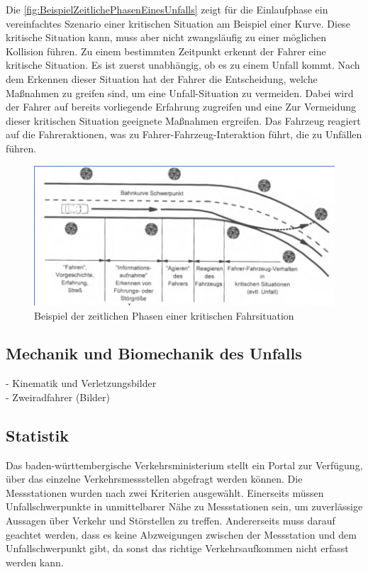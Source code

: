 Die \autoref{fig:BeispielZeitlichePhasenEinesUnfalls} zeigt für die Einlaufphase ein vereinfachtes Szenario einer kritischen Situation am Beispiel einer Kurve. Diese kritische Situation kann, muss aber nicht zwangsläufig zu einer möglichen Kollision führen. Zu einem bestimmten Zeitpunkt erkennt der Fahrer eine kritische Situation. Es ist zuerst unabhängig, ob es zu einem Unfall kommt. Nach dem Erkennen dieser Situation hat der Fahrer die Entscheidung, welche Maßnahmen zu greifen sind, um eine Unfall-Situation zu vermeiden. Dabei wird der Fahrer auf bereits vorliegende Erfahrung zugreifen und eine Zur Vermeidung dieser kritischen Situation geeignete Maßnahmen ergreifen. Das Fahrzeug reagiert auf die Fahreraktionen, was zu Fahrer-Fahrzeug-Interaktion führt, die zu Unfällen führen.\cite{Appel2002}\\


\begin{figure}[H]
	\centering
	\includegraphics[width=\linewidth]{Bilder/BeispielZeitlichePhasenEinesUnfalls.png}
	\caption{Beispiel der zeitlichen Phasen einer kritischen Fahrsituation \cite{Appel2002}}
	\label{fig:BeispielZeitlichePhasenEinesUnfalls}
\end{figure}

%
%
%
%
%
\subsection{Mechanik und Biomechanik des Unfalls}
- Kinematik und Verletzungsbilder\\
- Zweiradfahrer (Bilder)





\subsection{Statistik}
Das baden-württembergische Verkehrsministerium stellt ein Portal zur Verfügung, über das einzelne Verkehrsmessstellen abgefragt werden können. Die Messstationen wurden nach zwei Kriterien ausgewählt. Einerseits müssen Unfallschwerpunkte in unmittelbarer Nähe zu Messstationen sein, um zuverlässige Aussagen über Verkehr und Störstellen zu treffen.
Andererseits muss darauf geachtet werden, dass es keine Abzweigungen zwischen der Messstation und dem Unfallschwerpunkt gibt, da sonst das richtige Verkehrsaufkommen nicht erfasst werden kann.

